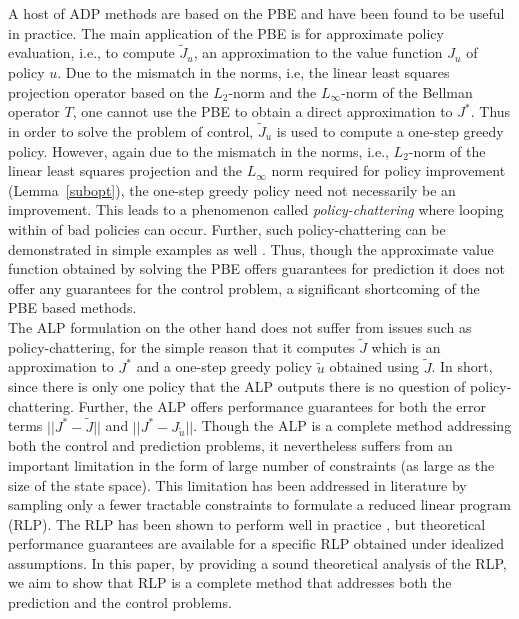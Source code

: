A host of ADP methods are based on the PBE and have been found to be useful in practice. The main application of the PBE is for approximate policy evaluation, i.e., to compute $\tilde{J}_u$, an approximation to the value function $J_u$ of policy $u$. Due to the mismatch in the norms, i.e, the linear least squares projection operator based on the $L_2$-norm and the $L_\infty$-norm of the Bellman operator $T$, one cannot use the PBE to obtain a direct approximation to $J^*$. Thus in order to solve the problem of control, $\tilde{J}_u$ is used to compute a one-step greedy policy. However, again due to the mismatch in the norms, i.e., $L_2$-norm of the linear least squares projection and the $L_\infty$ norm required for policy improvement (Lemma~\ref{subopt}), the one-step greedy policy need not necessarily be an improvement. This leads to a phenomenon called \emph{policy-chattering} \cite{dpchapter} where looping within of bad policies can occur. Further, such policy-chattering can be demonstrated in simple examples as well \cite{dpchapter}. Thus, though the approximate value function obtained by solving the PBE offers guarantees for prediction it does not offer any guarantees for the control problem, a significant shortcoming of the PBE based methods.\\
The ALP formulation \cite{ALP} on the other hand does not suffer from issues such as policy-chattering, for the simple reason that it computes $\tilde{J}$ which is an approximation to $J^*$ and a one-step greedy policy $\tilde{u}$ obtained using $\tilde{J}$. In short, since there is only one policy that the ALP outputs there is no question of policy-chattering. Further, the ALP offers performance guarantees for both the error terms $||J^*-\tilde{J}||$ and $||J^*-J_{\tilde{u}}||$. Though the ALP is a complete method addressing both the control and prediction problems, it nevertheless suffers from an important limitation in the form of large number of constraints (as large as the size of the state space). This limitation has been addressed in literature by sampling only a fewer tractable constraints to formulate a reduced linear program (RLP). The RLP has been shown to perform well in practice \cite{ALP,CS,CST}, but theoretical performance guarantees \cite{CS} are available for a specific RLP obtained under idealized assumptions. In this paper, by providing a sound theoretical analysis of the RLP, we aim to show that RLP is a complete method that addresses both the prediction and the control problems.
